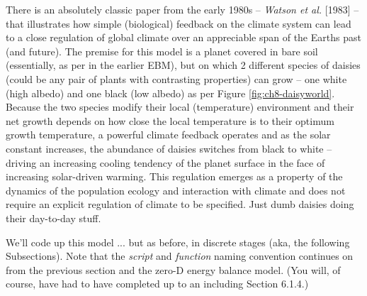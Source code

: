 \documentclass{tufte-book} %
\begin{document}
There is an absolutely classic paper from the early 1980s -- \textit{Watson et al.} [1983] -- that illustrates how simple (biological) feedback on the climate system can lead to a close regulation of global climate over an appreciable span of the Earths past (and future). The premise for this model is a planet covered in bare soil (essentially, as per in the earlier EBM), but on which 2 different species of daisies (could be any pair of plants with contrasting properties) can grow -- one white (high albedo) and one black (low albedo) as per Figure \ref{fig:ch8-daisyworld}. Because the two species modify their local (temperature) environment and their net growth depends on how close the local temperature is to their optimum growth temperature, a powerful climate feedback operates and as the solar constant increases, the abundance of daisies switches from black to white -- driving an increasing cooling tendency of the planet surface in the face of increasing solar-driven warming. This regulation emerges as a property of the dynamics of the population ecology and interaction with climate and does not require an explicit regulation of climate to be specified. Just dumb daisies doing their day-to-day stuff.

We'll code up this model ... but as before, in discrete stages (aka, the following Subsections). Note that the \textit{script} and \textit{function} naming convention continues on from the previous section and the zero-D energy balance model. (You will, of course, have had to have completed up to an including Section 6.1.4.)
\end{document}
